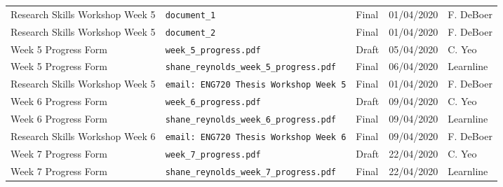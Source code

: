 \documentclass[10pt, landscape]{article}
\begin{document}
\begin{longtable}{p{7cm}p{10cm}p{1.5cm}p{2cm}p{2cm}}
	Research Skills Workshop Week 5					& \verb|document_1|															& Final				& 01/04/2020		 	& F. DeBoer\\
	
	Research Skills Workshop Week 5					& \verb|document_2|															& Final				& 01/04/2020		 	& F. DeBoer\\
	
	Week 5 Progress Form							& \verb|week_5_progress.pdf|												& Draft				& 05/04/2020			& C. Yeo\\
	
	Week 5 Progress Form							& \verb|shane_reynolds_week_5_progress.pdf|									& Final				& 06/04/2020			& Learnline\\
	
	Research Skills Workshop Week 5					& \verb|email: ENG720 Thesis Workshop Week 5|								& Final				& 01/04/2020		 	& F. DeBoer\\
	
	Week 6 Progress Form							& \verb|week_6_progress.pdf|												& Draft				& 09/04/2020			& C. Yeo\\
	
	Week 6 Progress Form							& \verb|shane_reynolds_week_6_progress.pdf|									& Final				& 09/04/2020			& Learnline\\
	
	Research Skills Workshop Week 6					& \verb|email: ENG720 Thesis Workshop Week 6|								& Final				& 09/04/2020		 	& F. DeBoer\\
	
	Week 7 Progress Form							& \verb|week_7_progress.pdf|												& Draft				& 22/04/2020			& C. Yeo\\
		
	Week 7 Progress Form							& \verb|shane_reynolds_week_7_progress.pdf|									& Final				& 22/04/2020			& Learnline\\
	
	\bottomrule
	\end{longtable}
\end{document}
